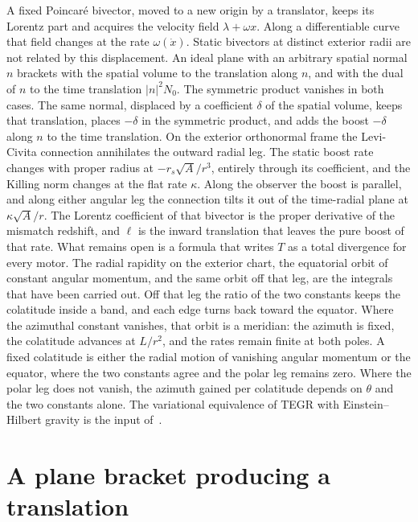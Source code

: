 \documentclass[a4paper]{article}
\begin{document}
A fixed Poincar\'{e} bivector, moved to a new origin by a translator, keeps its Lorentz part and acquires the velocity field \(\lambda+\omega x\). Along a differentiable curve that field changes at the rate \(\omega(\dot{x})\). Static bivectors at distinct exterior radii are not related by this displacement. An ideal plane with an arbitrary spatial normal \(n\) brackets with the spatial volume to the translation along \(n\), and with the dual of \(n\) to the time translation \(|n|^{2}N_{0}\). The symmetric product vanishes in both cases. The same normal, displaced by a coefficient \(\delta\) of the spatial volume, keeps that translation, places \(-\delta\) in the symmetric product, and adds the boost \(-\delta\) along \(n\) to the time translation. On the exterior orthonormal frame the Levi-Civita connection annihilates the outward radial leg. The static boost rate changes with proper radius at \(-r_{s}\sqrt{A}/r^{3}\), entirely through its coefficient, and the Killing norm changes at the flat rate \(\kappa\). Along the observer the boost is parallel, and along either angular leg the connection tilts it out of the time-radial plane at \(\kappa\sqrt{A}/r\). The Lorentz coefficient of that bivector is the proper derivative of the mismatch redshift, and \(\ell\) is the inward translation that leaves the pure boost of that rate. What remains open is a formula that writes \(T\) as a total divergence for every motor. The radial rapidity on the exterior chart, the equatorial orbit of constant angular momentum, and the same orbit off that leg, are the integrals that have been carried out. Off that leg the ratio of the two constants keeps the colatitude inside a band, and each edge turns back toward the equator. Where the azimuthal constant vanishes, that orbit is a meridian: the azimuth is fixed, the colatitude advances at \(L/r^{2}\), and the rates remain finite at both poles. A fixed colatitude is either the radial motion of vanishing angular momentum or the equator, where the two constants agree and the polar leg remains zero. Where the polar leg does not vanish, the azimuth gained per colatitude depends on \(\theta\) and the two constants alone. The variational equivalence of TEGR with Einstein--Hilbert gravity is the input of~\cite{maluf2013}.

\appendix

\section{A plane bracket producing a translation}
\label{app:bracket}
\end{document}
